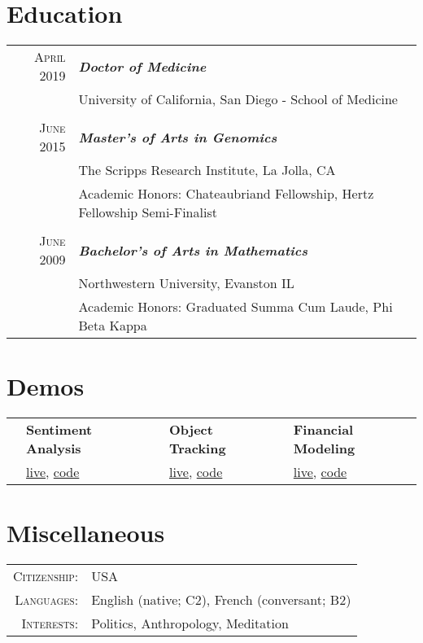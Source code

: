\documentclass{article}
\begin{document}
\section{Education}
\begin{tabular}{r | p{11cm}}	

\raggedleft \textsc{April} 2019 & \emph{\textbf{Doctor of Medicine}} \\ 
\raggedleft & University of California, San Diego - School of Medicine \\

 \multicolumn{2}{c}{} \\

\raggedleft \textsc{June} 2015 & \emph{\textbf{Master's of Arts in Genomics}} \\ 
  & The Scripps Research Institute, La Jolla, CA\\
  & Academic Honors: Chateaubriand Fellowship, Hertz Fellowship Semi-Finalist \\

  \multicolumn{2}{c}{} \\

\raggedleft \textsc{June} 2009 & \emph{\textbf{Bachelor's of Arts in Mathematics}} \\ 
  & Northwestern University, Evanston IL\\
  & Academic Honors: Graduated Summa Cum Laude, Phi Beta Kappa \\
\end{tabular}


\section{Demos}

	\begin{tabular}{r p{4cm} r p{4cm} r p{4cm} }
	
		\multirow{2}{*}{\Huge \color{starcolor}{\faSmileO}} &
		\textbf{Sentiment Analysis} & 
		\multirow{2}{*}{\Huge \color{starcolor}{\faRocket}} &
		\textbf{Object Tracking} &
		\multirow{2}{*}{\Huge \color{starcolor}{\faLineChart }} &
		\textbf{Financial Modeling}\\
		
		&
		\href{https://erickramer.xyz/sentiment/}{live}, \href{https://github.com/erickramer/sentiment}{code} & &
		\href{https://erickramer.xyz/asteroids}{live}, \href{https://github.com/erickramer/personal_site_flask/blob/master/elm/Asteroids.elm}{code} & &
		\href{https://eransom.shinyapps.io/financial_planning/}{live}, \href{https://github.com/erickramer/financial_dashboard}{code} \\	

		
	\end{tabular}

\section{Miscellaneous}

	\begin{tabular}{r l}
		\textsc{Citizenship}: & USA \\
		\textsc{Languages}: &  English (native; C2), French (conversant; B2)\\
		\textsc{Interests}: & Politics, Anthropology, Meditation
	\end{tabular}
\end{document}
